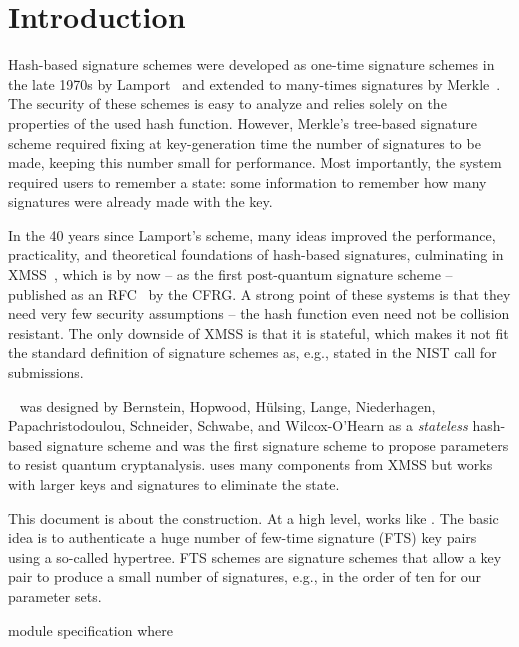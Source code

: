 \section{Introduction}
Hash-based signature schemes were developed as one-time signature schemes
in the late 1970s by Lamport~\cite{Lam79} 
and extended to many-times signatures by Merkle~\cite{Merkle1990}.
The security of these schemes is easy to analyze and relies
solely on the properties of the used hash function.
However,
Merkle's tree-based signature scheme required fixing at key-generation
time the number of signatures to be made, keeping this number small for 
performance. Most importantly, the system required users to remember 
a state: some information to remember how many signatures were already
made with the key. 

In the 40 years since Lamport's scheme, many ideas improved the 
performance, practicality,
and theoretical foundations
of hash-based signatures, culminating in 
XMSS~\cite{XMSS}, which is by now -- as the first post-quantum signature scheme -- 
published as an RFC~\cite{rfc8391} by the CFRG. A strong point of
these systems is that they need very few security assumptions -- 
the hash function even need not be collision resistant.
The only downside of XMSS is that it
is stateful, which makes it not fit the standard definition of 
signature schemes as, e.g., stated in the NIST call for submissions.

\spc ~\cite{Bernstein2015} was designed by Bernstein, Hopwood,
H{\"u}lsing, Lange, Niederhagen, Papachristodoulou, Schneider,
Schwabe, and Wilcox-O'Hearn as a {\em stateless} hash-based signature
scheme and was the first signature scheme to propose parameters to
resist quantum cryptanalysis. \spc uses many components from XMSS
but works with larger keys and signatures to eliminate the state.

This document is about the \spx construction.
At a high level, \spx works like \spc. The basic idea is to authenticate 
a huge number of few-time signature (FTS) key pairs using a so-called hypertree. 
FTS schemes are signature schemes that allow a key pair to produce a small 
number of signatures, e.g., in the order of ten %
for our parameter 
sets.

\begin{code}
  module specification where
\end{code}

